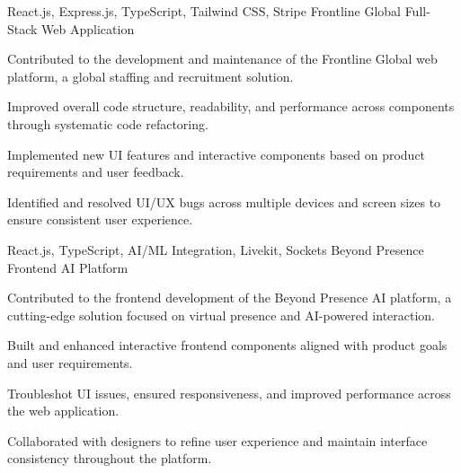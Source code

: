 

\begin{cventries}

  \cventry
    {React.js, Express.js, TypeScript, Tailwind CSS, Stripe} %
    {Frontline Global} %
    {Full-Stack Web Application}
    {}
    {
      \begin{cvitems} %
        \item {Contributed to the development and maintenance of the Frontline Global web platform, a global staffing and recruitment solution.}
        \item {Improved overall code structure, readability, and performance across components through systematic code refactoring.}
        \item {Implemented new UI features and interactive components based on product requirements and user feedback.}
        \item {Identified and resolved UI/UX bugs across multiple devices and screen sizes to ensure consistent user experience.}
      \end{cvitems}
    }

  \cventry
    {React.js, TypeScript, AI/ML Integration, Livekit, Sockets} %
    {Beyond Presence} %
    {Frontend AI Platform} %
    {}
    {
      \begin{cvitems} %
        \item {Contributed to the frontend development of the Beyond Presence AI platform, a cutting-edge solution focused on virtual presence and AI-powered interaction.}
        \item {Built and enhanced interactive frontend components aligned with product goals and user requirements.}
        \item {Troubleshot UI issues, ensured responsiveness, and improved performance across the web application.}
        \item {Collaborated with designers to refine user experience and maintain interface consistency throughout the platform.}
      \end{cvitems}
    }



\end{cventries}
